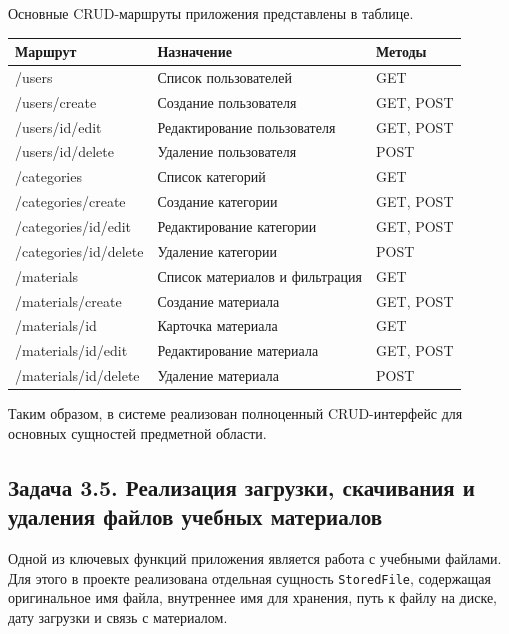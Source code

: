 \documentclass[14pt,a4paper]{extarticle}
\begin{document}
Основные CRUD-маршруты приложения представлены в таблице.

\begin{center}
\footnotesize\begin{tabularx}{0.96\textwidth}{>{\ttfamily\raggedright\arraybackslash}p{6.0cm} >{\raggedright\arraybackslash}X >{\raggedright\arraybackslash}p{1.6cm}}
\toprule
\textbf{Маршрут} & \textbf{Назначение} & \textbf{Методы} \\
\midrule
/users & Список пользователей & GET \\
/users/create & Создание пользователя & GET, POST \\
/users/{id}/edit & Редактирование пользователя & GET, POST \\
/users/{id}/delete & Удаление пользователя & POST \\
/categories & Список категорий & GET \\
/categories/create & Создание категории & GET, POST \\
/categories/{id}/edit & Редактирование категории & GET, POST \\
/categories/{id}/delete & Удаление категории & POST \\
/materials & Список материалов и фильтрация & GET \\
/materials/create & Создание материала & GET, POST \\
/materials/{id} & Карточка материала & GET \\
/materials/{id}/edit & Редактирование материала & GET, POST \\
/materials/{id}/delete & Удаление материала & POST \\
\bottomrule
\end{tabularx}
\end{center}

Таким образом, в системе реализован полноценный CRUD-интерфейс для основных сущностей предметной области.

\subsection{Задача 3.5. Реализация загрузки, скачивания и удаления файлов учебных материалов}

Одной из ключевых функций приложения является работа с учебными файлами. Для этого в проекте реализована отдельная сущность \texttt{StoredFile}, содержащая оригинальное имя файла, внутреннее имя для хранения, путь к файлу на диске, дату загрузки и связь с материалом.
\end{document}
